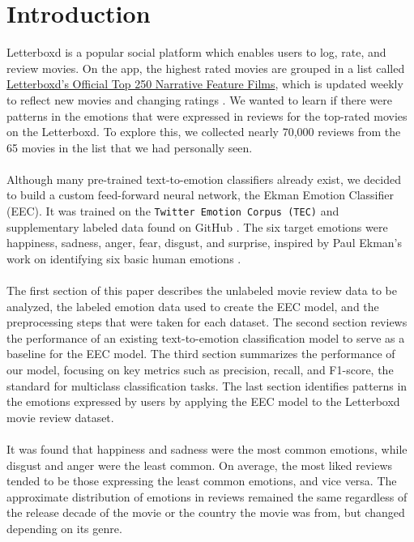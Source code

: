 \documentclass[11pt]{article}
\begin{document}
\section{Introduction}
Letterboxd is a popular social platform which enables users to log, rate, and review movies. On the app, the highest rated movies are grouped in a list called \href{https://letterboxd.com/dave/list/official-top-250-narrative-feature-films/}{Letterboxd's Official Top 250 Narrative Feature Films}, which is updated weekly to reflect new movies and changing ratings \cite{Vis}. We wanted to learn if there were patterns in the emotions that were expressed in reviews for the top-rated movies on the Letterboxd. To explore this, we collected nearly 70,000 reviews from the 65 movies in the list that we had personally seen. \\ \\
Although many pre-trained text-to-emotion classifiers already exist, we decided to build a custom feed-forward neural network, the Ekman Emotion Classifier (EEC). It was trained on the \texttt{Twitter Emotion Corpus (TEC)} and supplementary labeled data found on GitHub \cite{mohammad-2012-emotional, Mohammad, Valente}. The six target emotions were happiness, sadness, anger, fear, disgust, and surprise, inspired by Paul Ekman's work on identifying six basic human emotions \cite{NeuroLaunch}. \\ \\
The first section of this paper describes the unlabeled movie review data to be analyzed, the labeled emotion data used to create the EEC model, and the preprocessing steps that were taken for each dataset. The second section reviews the performance of an existing text-to-emotion classification model to serve as a baseline for the EEC model. The third section summarizes the performance of our model, focusing on key metrics such as precision, recall, and F1-score, the standard for multiclass classification tasks. The last section identifies patterns in the emotions expressed by users by applying the EEC model to the Letterboxd movie review dataset. \\ \\
It was found that happiness and sadness were the most common emotions, while disgust and anger were the least common. On average, the most liked reviews tended to be those expressing the least common emotions, and vice versa. The approximate distribution of emotions in reviews remained the same regardless of the release decade of the movie or the country the movie was from, but changed depending on its genre.
\end{document}
